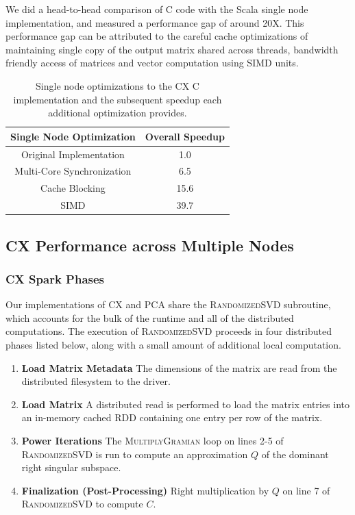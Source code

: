    We did a head-to-head comparison of C code with the Scala single
 node implementation, and measured a performance gap of around 20X.
 This performance gap can be attributed to the careful cache
 optimizations of maintaining single copy of the output matrix shared
 across threads, bandwidth friendly access of matrices and vector
 computation using SIMD units.
 
  \begin{table}
  \begin{center}
  \begin{tabular}{ |c|c| } 
  \hline
  Single Node Optimization & Overall Speedup\\
  \hline
  Original Implementation & 1.0  \\
  Multi-Core Synchronization & 6.5 \\
  Cache Blocking & 15.6 \\
  SIMD & 39.7 \\
  \hline

  \end{tabular}
  \end{center}
  \caption{Single node optimizations to the CX C implementation and
  the subsequent speedup  each additional optimization provides.}
  \label{tab:single_node}
  \end{table}
 



  \subsection{CX Performance across Multiple Nodes}

  \subsubsection{CX Spark Phases}
  Our implementations of CX and PCA share the \textsc{RandomizedSVD} subroutine, which accounts for the bulk of the runtime and all of the distributed computations.
  The execution of \textsc{RandomizedSVD} proceeds in four distributed phases listed below, along with a small amount of additional local computation.
  \begin{enumerate}
      \item \textbf{Load Matrix Metadata}
         The dimensions of the matrix are read from the distributed filesystem to the driver.
      \item \textbf{Load Matrix}
         A distributed read is performed to load the matrix entries into an in-memory cached
         RDD containing one entry per row of the matrix.
      \item \textbf{Power Iterations}
         The \textsc{MultiplyGramian} loop on lines 2-5 of
         \textsc{RandomizedSVD} is run to compute an approximation $Q$
         of the dominant right singular subspace.
       \item \textbf{Finalization (Post-Processing)}
         Right multiplication by $Q$ on line 7 of \textsc{RandomizedSVD} to compute $C$.
  \end{enumerate}

